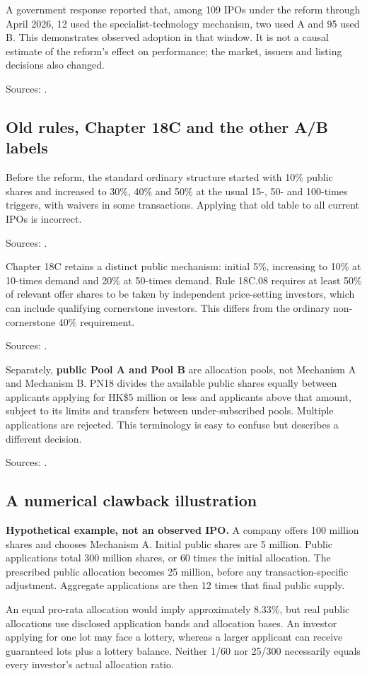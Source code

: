 \documentclass[11pt,a4paper]{article}
\newcommand{\source}[1]{\par{\footnotesize\color{ink}Sources: \cite{#1}.}\par}
\begin{document}
A government response reported that, among 109 IPOs under the reform through April 2026, 12 used the specialist-technology mechanism, two used A and 95 used B. This demonstrates observed adoption in that window. It is not a causal estimate of the reform's effect on performance; the market, issuers and listing decisions also changed.\source{lcq9}

\subsection{Old rules, Chapter 18C and the other A/B labels}
Before the reform, the standard ordinary structure started with 10\% public shares and increased to 30\%, 40\% and 50\% at the usual 15-, 50- and 100-times triggers, with waivers in some transactions. Applying that old table to all current IPOs is incorrect.\source{offeringannex}

Chapter 18C retains a distinct public mechanism: initial 5\%, increasing to 10\% at 10-times demand and 20\% at 50-times demand. Rule 18C.08 requires at least 50\% of relevant offer shares to be taken by independent price-setting investors, which can include qualifying cornerstone investors. This differs from the ordinary non-cornerstone 40\% requirement.\source{lcq9,techallocation}

Separately, \textbf{public Pool A and Pool B} are allocation pools, not Mechanism A and Mechanism B. PN18 divides the available public shares equally between applicants applying for HK\$5 million or less and applicants above that amount, subject to its limits and transfers between under-subscribed pools. Multiple applications are rejected. This terminology is easy to confuse but describes a different decision.\source{pn18}

\subsection{A numerical clawback illustration}
\textbf{Hypothetical example, not an observed IPO.} A company offers 100 million shares and chooses Mechanism A. Initial public shares are 5 million. Public applications total 300 million shares, or 60 times the initial allocation. The prescribed public allocation becomes 25 million, before any transaction-specific adjustment. Aggregate applications are then 12 times that final public supply.

An equal pro-rata allocation would imply approximately 8.33\%, but real public allocations use disclosed application bands and allocation bases. An investor applying for one lot may face a lottery, whereas a larger applicant can receive guaranteed lots plus a lottery balance. Neither 1/60 nor 25/300 necessarily equals every investor's actual allocation ratio.
\end{document}
